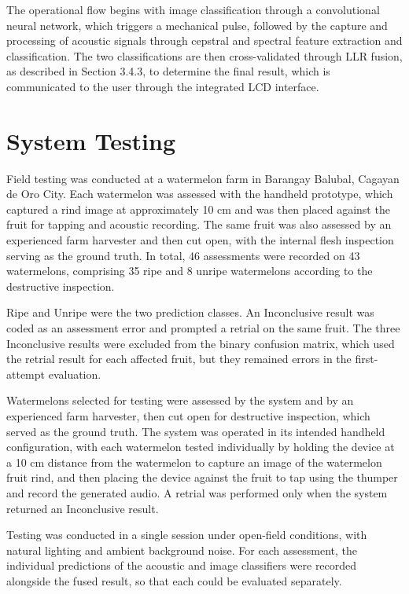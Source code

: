 \begin{thesisprose}
The operational flow begins with image classification through a convolutional neural network, which triggers a mechanical pulse, followed by the capture and processing of acoustic signals through cepstral and spectral feature extraction and classification. The two classifications are then cross-validated through LLR fusion, as described in Section 3.4.3, to determine the final result, which is communicated to the user through the integrated LCD interface.

\section{System Testing}

Field testing was conducted at a watermelon farm in Barangay Balubal, Cagayan de Oro City. Each watermelon was assessed with the handheld prototype, which captured a rind image at approximately 10 cm and was then placed against the fruit for tapping and acoustic recording. The same fruit was also assessed by an experienced farm harvester and then cut open, with the internal flesh inspection serving as the ground truth. In total, 46 assessments were recorded on 43 watermelons, comprising 35 ripe and 8 unripe watermelons according to the destructive inspection.

Ripe and Unripe were the two prediction classes. An Inconclusive result was coded as an assessment error and prompted a retrial on the same fruit. The three Inconclusive results were excluded from the binary confusion matrix, which used the retrial result for each affected fruit, but they remained errors in the first-attempt evaluation.

Watermelons selected for testing were assessed by the system and by an experienced farm harvester, then cut open for destructive inspection, which served as the ground truth. The system was operated in its intended handheld configuration, with each watermelon tested individually by holding the device at a 10 cm distance from the watermelon to capture an image of the watermelon fruit rind, and then placing the device against the fruit to tap using the thumper and record the generated audio. A retrial was performed only when the system returned an Inconclusive result.

Testing was conducted in a single session under open-field conditions, with natural lighting and ambient background noise. For each assessment, the individual predictions of the acoustic and image classifiers were recorded alongside the fused result, so that each could be evaluated separately.


\end{thesisprose}
